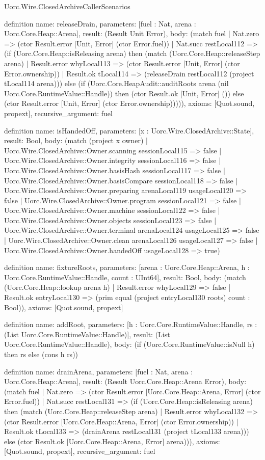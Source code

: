 \begin{lexlean}{Uorc.Wire.ClosedArchiveCallerScenarios}
\begin{semanticmodule}
definition{
  name: releaseDrain,
  parameters: [fuel : Nat, arena : Uorc.Core.Heap::Arena],
  result: (Result Unit Error),
  body: (match fuel
    | Nat.zero => (ctor Result.error [Unit, Error] (ctor Error.fuel))
    | Nat.succ restLocal112 => (if (Uorc.Core.Heap::isReleasing arena) then (match (Uorc.Core.Heap::releaseStep arena)
      | Result.error whyLocal113 => (ctor Result.error [Unit, Error] (ctor Error.ownership))
      | Result.ok tLocal114 => (releaseDrain restLocal112 (project tLocal114 arena))) else (if (Uorc.Core.HeapAudit::auditRoots arena (nil Uorc.Core.RuntimeValue::Handle)) then (ctor Result.ok [Unit, Error] ()) else (ctor Result.error [Unit, Error] (ctor Error.ownership))))),
  axioms: [Quot.sound, propext],
  recursive_argument: fuel
}

definition{
  name: isHandedOff,
  parameters: [x : Uorc.Wire.ClosedArchive::State],
  result: Bool,
  body: (match (project x owner)
    | Uorc.Wire.ClosedArchive::Owner.scanning sessionLocal115 => false
    | Uorc.Wire.ClosedArchive::Owner.integrity sessionLocal116 => false
    | Uorc.Wire.ClosedArchive::Owner.basisHash sessionLocal117 => false
    | Uorc.Wire.ClosedArchive::Owner.basisCompare sessionLocal118 => false
    | Uorc.Wire.ClosedArchive::Owner.preparing arenaLocal119 usageLocal120 => false
    | Uorc.Wire.ClosedArchive::Owner.program sessionLocal121 => false
    | Uorc.Wire.ClosedArchive::Owner.machine sessionLocal122 => false
    | Uorc.Wire.ClosedArchive::Owner.objects sessionLocal123 => false
    | Uorc.Wire.ClosedArchive::Owner.terminal arenaLocal124 usageLocal125 => false
    | Uorc.Wire.ClosedArchive::Owner.clean arenaLocal126 usageLocal127 => false
    | Uorc.Wire.ClosedArchive::Owner.handedOff usageLocal128 => true)
}

definition{
  name: fixtureRoots,
  parameters: [arena : Uorc.Core.Heap::Arena, h : Uorc.Core.RuntimeValue::Handle, count : UInt64],
  result: Bool,
  body: (match (Uorc.Core.Heap::lookup arena h)
    | Result.error whyLocal129 => false
    | Result.ok entryLocal130 => (prim equal (project entryLocal130 roots) count : Bool)),
  axioms: [Quot.sound, propext]
}

definition{
  name: addRoot,
  parameters: [h : Uorc.Core.RuntimeValue::Handle, rs : (List Uorc.Core.RuntimeValue::Handle)],
  result: (List Uorc.Core.RuntimeValue::Handle),
  body: (if (Uorc.Core.RuntimeValue::isNull h) then rs else (cons h rs))
}

definition{
  name: drainArena,
  parameters: [fuel : Nat, arena : Uorc.Core.Heap::Arena],
  result: (Result Uorc.Core.Heap::Arena Error),
  body: (match fuel
    | Nat.zero => (ctor Result.error [Uorc.Core.Heap::Arena, Error] (ctor Error.fuel))
    | Nat.succ restLocal131 => (if (Uorc.Core.Heap::isReleasing arena) then (match (Uorc.Core.Heap::releaseStep arena)
      | Result.error whyLocal132 => (ctor Result.error [Uorc.Core.Heap::Arena, Error] (ctor Error.ownership))
      | Result.ok tLocal133 => (drainArena restLocal131 (project tLocal133 arena))) else (ctor Result.ok [Uorc.Core.Heap::Arena, Error] arena))),
  axioms: [Quot.sound, propext],
  recursive_argument: fuel
}


\end{semanticmodule}
\end{lexlean}
